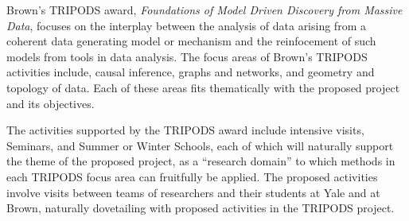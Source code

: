 
Brown's TRIPODS award, \emph{Foundations of Model Driven Discovery from Massive Data}, focuses on the interplay between the analysis of data arising from a coherent data generating model or mechanism and the reinfocement of such models from tools in data analysis. The focus areas of Brown's TRIPODS activities include, causal inference, graphs and networks, and geometry and topology of data. Each of these areas fits thematically with the proposed project and its objectives.

The activities supported by the TRIPODS award include intensive visits, Seminars, and Summer or Winter Schools, each of which will naturally support the theme of the proposed project, as a ``research domain'' to which methods in each TRIPODS focus area can fruitfully be applied. The proposed activities involve visits between teams of researchers and their students at Yale and at Brown, naturally dovetailing with proposed activities in the TRIPODS project. 